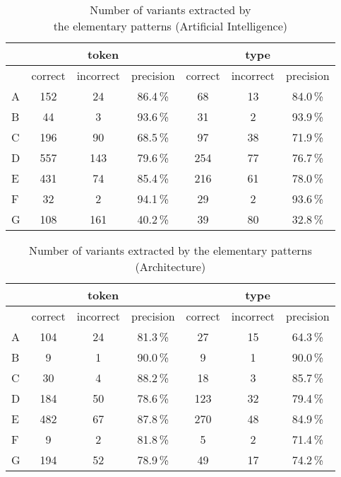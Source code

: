 \begin{table*}[htb]
\begin{center}
\begin{tabular}{l|ccc|ccc}
\hline
& \multicolumn{3}{|c}{token} & \multicolumn{3}{|c}{type}\\
\hline
& correct & incorrect & precision & correct & incorrect & precision\\
\hline
\hline
A & 152 & 24 & 86.4\,\% & 68 & 13 & 84.0\,\%\\
B & 44 & 3 & 93.6\,\% & 31 & 2 & 93.9\,\%\\
C & 196 & 90 & 68.5\,\% & 97 & 38 & 71.9\,\%\\
D & 557 & 143 & 79.6\,\% & 254 & 77 & 76.7\,\%\\
E & 431 & 74 & 85.4\,\% & 216 & 61 & 78.0\,\%\\
F & 32 & 2 & 94.1\,\% & 29 & 2 & 93.6\,\%\\
G & 108 & 161 & 40.2\,\% & 39 & 80 & 32.8\,\%\\
\hline
\end{tabular}

\end{center}
\caption{Number of variants extracted by \\ the elementary patterns (Artificial Intelligence)}
\end{table*}

\begin{table*}[htb]
\begin{center}
\begin{tabular}{l|ccc|ccc}
\hline
& \multicolumn{3}{|c}{token} & \multicolumn{3}{|c}{type}\\
\hline
& correct & incorrect & precision & correct & incorrect & precision\\
\hline
\hline
A & 104 & 24 & 81.3\,\% & 27 & 15 & 64.3\,\%\\
B & 9 & 1 & 90.0\,\% & 9 & 1 & 90.0\,\%\\
C & 30 & 4 & 88.2\,\% & 18 & 3 & 85.7\,\%\\
D & 184 & 50 & 78.6\,\% & 123 & 32 & 79.4\,\%\\
E & 482 & 67 & 87.8\,\% & 270 & 48 & 84.9\,\%\\
F & 9 & 2 & 81.8\,\% & 5 & 2 & 71.4\,\%\\
G & 194 & 52 & 78.9\,\% & 49 & 17 & 74.2\,\%\\
\hline
\end{tabular}

\end{center}
\caption{Number of variants extracted by the elementary patterns
(Architecture)}
\end{table*}

